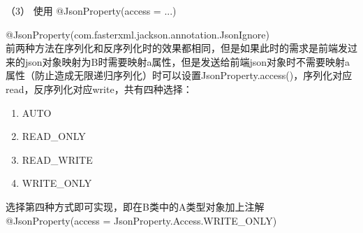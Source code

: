 （3） 使用 @JsonProperty(access = ...)

@JsonProperty(com.fasterxml.jackson.annotation.JsonIgnore)\\
前两种方法在序列化和反序列化时的效果都相同，但是如果此时的需求是前端发过来的json对象映射为B时需要映射a属性，但是发送给前端json对象时不需要映射a属性（防止造成无限递归序列化）时可以设置JsonProperty.access()，序列化对应read，反序列化对应write，共有四种选择：

\begin{enumerate}[label=\circled{\arabic*}]
  \item AUTO
  \item READ\_ONLY
  \item READ\_WRITE
  \item WRITE\_ONLY
\end{enumerate}

选择第四种方式即可实现，即在B类中的A类型对象加上注解 @JsonProperty(access = JsonProperty.Access.WRITE\_ONLY)


